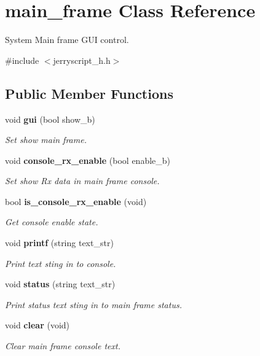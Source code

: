 \section{main\+\_\+frame Class Reference}
\label{classmain__frame}


System Main frame G\+UI control.  




{\ttfamily \#include $<$jerryscript\+\_\+h.\+h$>$}

\subsection*{Public Member Functions}
\begin{DoxyCompactItemize}
\item 
void \textbf{ gui} (bool show\+\_\+b)
\begin{DoxyCompactList}\small\item\em Set show main frame. \end{DoxyCompactList}\item 
void \textbf{ console\+\_\+rx\+\_\+enable} (bool enable\+\_\+b)
\begin{DoxyCompactList}\small\item\em Set show Rx data in main frame console. \end{DoxyCompactList}\item 
bool \textbf{ is\+\_\+console\+\_\+rx\+\_\+enable} (void)
\begin{DoxyCompactList}\small\item\em Get console enable state. \end{DoxyCompactList}\item 
void \textbf{ printf} (string text\+\_\+str)
\begin{DoxyCompactList}\small\item\em Print text sting in to console. \end{DoxyCompactList}\item 
void \textbf{ status} (string text\+\_\+str)
\begin{DoxyCompactList}\small\item\em Print status text sting in to main frame status. \end{DoxyCompactList}\item 
void \textbf{ clear} (void)
\begin{DoxyCompactList}\small\item\em Clear main frame console text. \end{DoxyCompactList}\item 

\end{DoxyCompactItemize}

